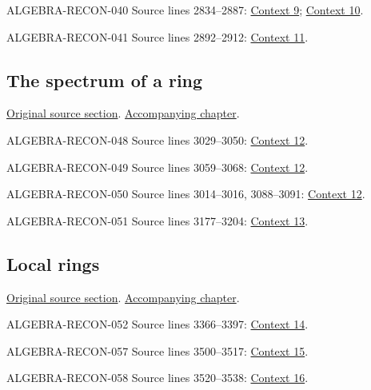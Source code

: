 \begin{AlgebraSourceRoutes}
\item[ALGEBRA-RECON-040] Source lines 2834--2887: \hyperlink{algebra-context-009}{Context 9}; \hyperlink{algebra-context-010}{Context 10}.
\item[ALGEBRA-RECON-041] Source lines 2892--2912: \hyperlink{algebra-context-011}{Context 11}.
\end{AlgebraSourceRoutes}

\subsection{The spectrum of a ring}
\hypertarget{algebra-source-section-spectrum-ring}{}
\noindent\href{https://github.com/stacks/stacks-project/blob/a04446e57ec1fbc252a871afcec7752fb2807b14/algebra.tex\#L2964}{Original source section}. \href{algebra.pdf\#nameddest=section-spectrum-ring}{Accompanying chapter}.

\begin{AlgebraSourceRoutes}
\item[ALGEBRA-RECON-048] Source lines 3029--3050: \hyperlink{algebra-context-012}{Context 12}.
\item[ALGEBRA-RECON-049] Source lines 3059--3068: \hyperlink{algebra-context-012}{Context 12}.
\item[ALGEBRA-RECON-050] Source lines 3014--3016, 3088--3091: \hyperlink{algebra-context-012}{Context 12}.
\item[ALGEBRA-RECON-051] Source lines 3177--3204: \hyperlink{algebra-context-013}{Context 13}.
\end{AlgebraSourceRoutes}

\subsection{Local rings}
\hypertarget{algebra-source-section-local-rings}{}
\noindent\href{https://github.com/stacks/stacks-project/blob/a04446e57ec1fbc252a871afcec7752fb2807b14/algebra.tex\#L3305}{Original source section}. \href{algebra.pdf\#nameddest=section-local-rings}{Accompanying chapter}.

\begin{AlgebraSourceRoutes}
\item[ALGEBRA-RECON-052] Source lines 3366--3397: \hyperlink{algebra-context-014}{Context 14}.
\item[ALGEBRA-RECON-057] Source lines 3500--3517: \hyperlink{algebra-context-015}{Context 15}.
\item[ALGEBRA-RECON-058] Source lines 3520--3538: \hyperlink{algebra-context-016}{Context 16}.
\end{AlgebraSourceRoutes}


